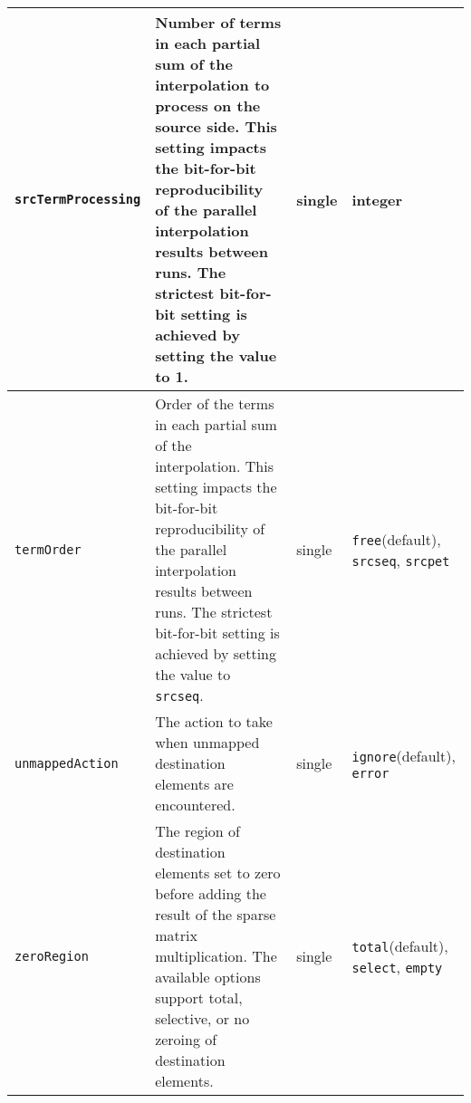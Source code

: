 \begin{tabular}{|p{4cm}|p{5cm}|p{1cm}|p{35mm}|}
     {\tt srcTermProcessing} & Number of terms in each partial sum of the interpolation to process on the source side. This setting impacts the bit-for-bit reproducibility of the parallel interpolation results between runs. The strictest bit-for-bit setting is achieved by setting the value to 1. & single & integer\\ \hline
     {\tt termOrder} & Order of the terms in each partial sum of the interpolation. This setting impacts the bit-for-bit reproducibility of the parallel interpolation results between runs. The strictest bit-for-bit setting is achieved by setting the value to {\tt srcseq}. & single & {\tt free}(default), {\tt srcseq}, {\tt srcpet}\\ \hline
     {\tt unmappedAction} & The action to take when unmapped destination elements are encountered. & single & {\tt ignore}(default), {\tt error}\\ \hline
     {\tt zeroRegion} & The region of destination elements set to zero before adding the result of the sparse matrix multiplication. The available options support total, selective, or no zeroing of destination elements. & single & {\tt total}(default), {\tt select}, {\tt empty}\\ \hline
     \hline
\end{tabular}

